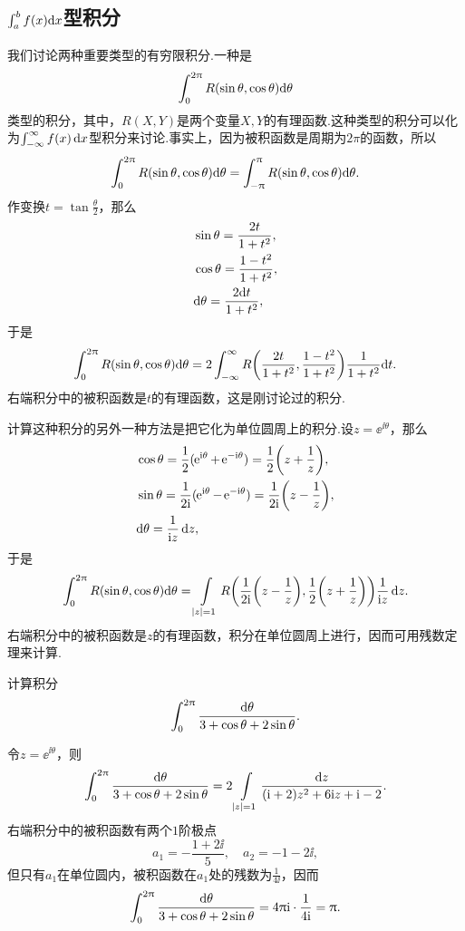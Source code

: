 \subsection{\mbox{$\int_a^b f(x){\normalfont\textrm d}x$}型积分}
我们讨论两种重要类型的有穷限积分.一种是
\[\int_0^{2\pi}R(\sin\theta,\cos\theta)\textrm d\theta\]
类型的积分，其中，$R(X,Y)$是两个变量$X,Y$的有理函数.这种类型的积分可以化为$\int_{-\infty}^\infty f(x)\dx$型积分来讨论.事实上，因为被积函数是周期为$2\pi$的函数，所以
\[\int_0^{2\pi}R(\sin\theta,\cos\theta)\textrm d\theta=\int_{-\pi}^{\pi}R(\sin\theta,\cos\theta)\textrm d\theta.\]
作变换$t=\tan\frac\theta2$，那么
\begin{align*}
&\sin\theta=\frac{2t}{1+t^2},\\
&\cos\theta=\frac{1-t^2}{1+t^2},\\
&\textrm d\theta=\frac{2\textrm dt}{1+t^2},
\end{align*}
于是
\[\int_0^{2\pi}R(\sin\theta,\cos\theta)\textrm d\theta
=2\int_{-\infty}^\infty R\bigg(\frac{2t}{1+t^2},\frac{1-t^2}{1+t^2}\bigg)
\frac1{1+t^2}\textrm dt.\]
右端积分中的被积函数是$t$的有理函数，这是刚讨论过的积分.

计算这种积分的另外一种方法是把它化为单位圆周上的积分.设$z=\ee^{\ii\theta}$，那么
\begin{align*}
&\cos\theta=\frac12(\ee^{\ii\theta}+\ee^{-\ii\theta})=\frac12\bigg(z+\frac1z\bigg),\\
&\sin\theta=\frac1{2\ii}(\ee^{\ii\theta}-\ee^{-\ii\theta})=\frac1{2\ii}\bigg(z-\frac1z\bigg),\\
&\textrm d\theta=\frac{1}{\ii z}\dz,
\end{align*}
于是
\[\int_0^{2\pi}R(\sin\theta,\cos\theta)\textrm d\theta=
\int\limits_{|z|=1}R\bigg(\frac1{2\ii}\bigg(z-\frac1z\bigg),
\frac12\bigg(z+\frac1z\bigg)\bigg)\frac1{\ii z}\dz.\]
右端积分中的被积函数是$z$的有理函数，积分在单位圆周上进行，因而可用残数定理来计算.

\begin{example}\label{exam5.5.13}
计算积分
\[\int_0^{2\pi}\frac{\textrm d\theta}{3+\cos\theta+2\sin\theta}.\]
\end{example}
\begin{solution}
令$z=\ee^{\ii\theta}$，则
\[\int_0^{2\pi}\frac{\textrm d\theta}{3+\cos\theta+2\sin\theta}
=2\int\limits_{|z|=1}\frac{\dz}{(\ii+2)z^2+6\ii z+\ii-2}.\]
右端积分中的被积函数有两个$1$阶极点
\[a_1=-\frac{1+2\ii}5,\quad a_2=-1-2\ii,\]
但只有$a_1$在单位圆内，被积函数在$a_1$处的残数为$\frac1{4\ii}$，因而
\begin{equation*}
\int_0^{2\pi}\frac{\textrm d\theta}{3+\cos\theta+2\sin\theta}
=4\pi\ii\cdot\frac1{4\ii}=\pi.
\end{equation*}
\end{solution}

